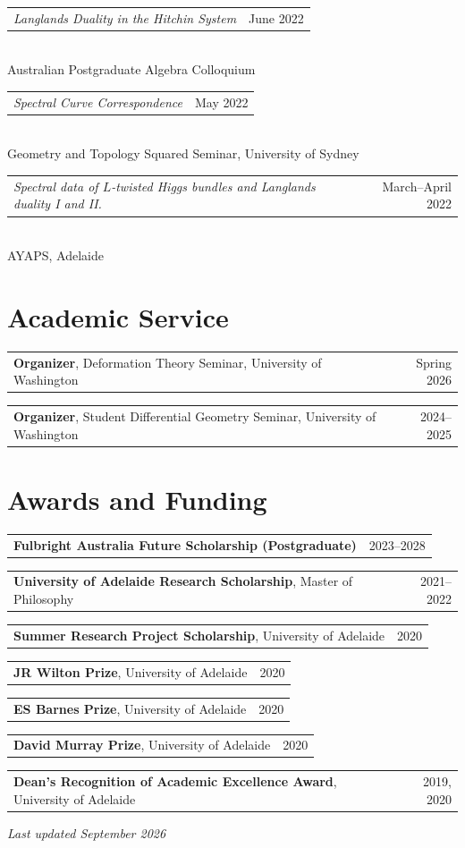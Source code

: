 \documentclass[11pt]{article}
\makeatletter
\newcommand{\cvitem}[2]{%
  \noindent
  \begin{tabularx}{\textwidth}{@{}Xr@{}}
    #1 & #2
  \end{tabularx}
}
\newcommand{\talk}[3]{%
  \cvitem{\textit{#1}}{#3}\\[-1pt]
  #2
  \vspace{5pt}
}
\makeatother
\begin{document}
\talk
  {Langlands Duality in the Hitchin System}
  {Australian Postgraduate Algebra Colloquium}
  {June 2022}

\talk
  {Spectral Curve Correspondence}
  {Geometry and Topology Squared Seminar, University of Sydney}
  {May 2022}

\talk
  {Spectral data of \(L\)-twisted Higgs bundles and Langlands duality I and II.}
  {AYAPS, Adelaide}
  {March--April 2022}

\section{Academic Service}

\cvitem{\textbf{Organizer}, Deformation Theory Seminar, University of Washington}{Spring 2026}
\vspace{4pt}

\cvitem{\textbf{Organizer}, Student Differential Geometry Seminar, University of Washington}{2024--2025}

\section{Awards and Funding}

\cvitem{\textbf{Fulbright Australia Future Scholarship (Postgraduate)}}{2023--2028}
\vspace{3pt}

\cvitem{\textbf{University of Adelaide Research Scholarship}, Master of Philosophy}{2021--2022}
\vspace{3pt}

\cvitem{\textbf{Summer Research Project Scholarship}, University of Adelaide}{2020}
\vspace{3pt}

\cvitem{\textbf{JR Wilton Prize}, University of Adelaide}{2020}
\vspace{3pt}

\cvitem{\textbf{ES Barnes Prize}, University of Adelaide}{2020}
\vspace{3pt}

\cvitem{\textbf{David Murray Prize}, University of Adelaide}{2020}
\vspace{3pt}

\cvitem{\textbf{Dean's Recognition of Academic Excellence Award}, University of Adelaide}{2019, 2020}

\vfill
\begin{flushright}
    \small\textit{Last updated September 2026}
\end{flushright}
\end{document}
